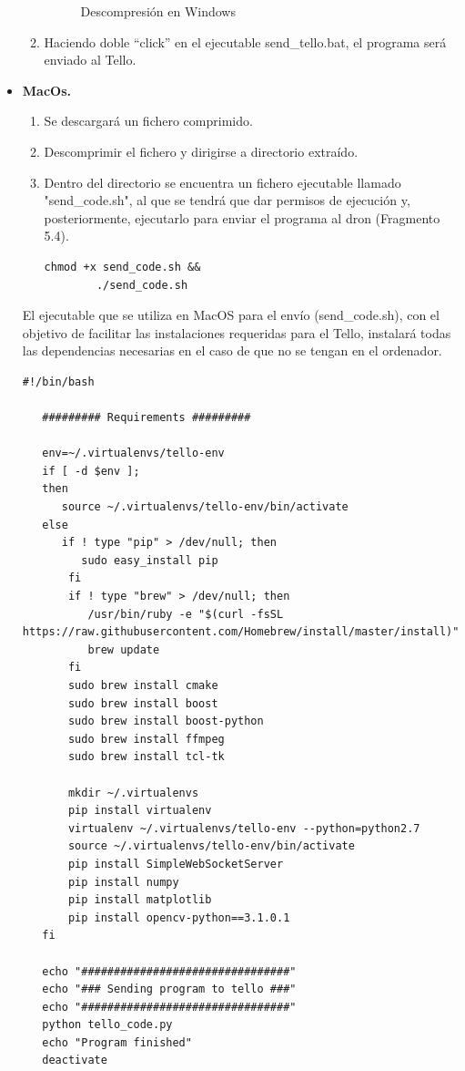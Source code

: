 \documentclass{report}
\begin{document}
\begin{itemize}
\begin{enumerate}
\begin{figure}[h!]
  				\caption{Descompresión en Windows}
  				\label{Descompresión en Windows}
			\end{figure}
			\item Haciendo doble “click” en el ejecutable send\_tello.bat, el programa será enviado al Tello.
		\end{enumerate}
	\item \textbf{MacOs.}
		\begin{enumerate}
			\item Se descargará un fichero comprimido.
			\item Descomprimir el fichero y dirigirse a  directorio extraído.
			\item Dentro del directorio se encuentra un fichero ejecutable llamado "send\_code.sh", al que se tendrá que dar permisos de ejecución y, posteriormente, ejecutarlo para enviar el programa al dron (Fragmento 5.4).			
			\\
			\begin{lstlisting}[frame=single,breaklines=true, label=Comandos para ejecución del envío en MacOs, caption=Comandos para ejecución del envío en MacOs,  captionpos=b]
		chmod +x send_code.sh &&
		./send_code.sh
			\end{lstlisting}
		\end{enumerate}

		El ejecutable que se utiliza en MacOS para el envío (send\_code.sh), con el objetivo de facilitar las instalaciones requeridas para el Tello, instalará todas las dependencias necesarias en el caso de que no se tengan en el ordenador.
		\\
\begin{lstlisting}[frame=single,breaklines=true, label=Ejecutable de envio para MacOs, caption=Ejecutable de envio para MacOs,  captionpos=b]
   #!/bin/bash

   ######### Requirements #########

   env=~/.virtualenvs/tello-env
   if [ -d $env ];
   then
      source ~/.virtualenvs/tello-env/bin/activate
   else
      if ! type "pip" > /dev/null; then
         sudo easy_install pip
       fi
       if ! type "brew" > /dev/null; then
          /usr/bin/ruby -e "$(curl -fsSL https://raw.githubusercontent.com/Homebrew/install/master/install)"  
          brew update
       fi
       sudo brew install cmake
       sudo brew install boost
       sudo brew install boost-python
       sudo brew install ffmpeg
       sudo brew install tcl-tk
    
       mkdir ~/.virtualenvs
       pip install virtualenv
       virtualenv ~/.virtualenvs/tello-env --python=python2.7
       source ~/.virtualenvs/tello-env/bin/activate
       pip install SimpleWebSocketServer
       pip install numpy
       pip install matplotlib
       pip install opencv-python==3.1.0.1
   fi

   echo "################################"
   echo "### Sending program to tello ###"
   echo "################################"
   python tello_code.py
   echo "Program finished"
   deactivate
\end{lstlisting}

\end{itemize}
\end{document}
